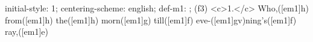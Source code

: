 initial-style: 1;
centering-scheme: english;
def-m1: \grealign;
(f3) <c>1.</c> Who,([em1]h) from([em1]h) the([em1]h) morn([em1]g) till([em1]f) eve-([em1]gv)ning's([em1]f) ray,([em1]e)